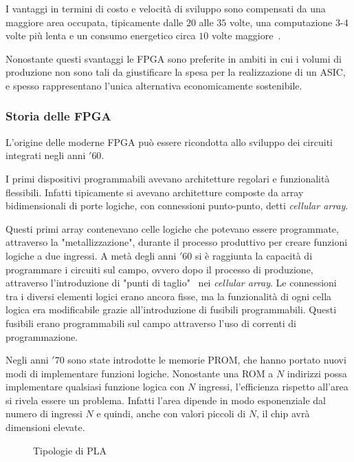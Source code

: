 I vantaggi in termini di costo e velocità di sviluppo sono compensati da una maggiore area occupata, tipicamente dalle $20$ alle $35$ volte, una computazione $3$-$4$ volte più lenta e un consumo energetico circa $10$ volte maggiore~\cite{4068926}.

Nonostante questi svantaggi le FPGA sono preferite in ambiti in cui i volumi di produzione non sono tali da giustificare la spesa per la realizzazione di un ASIC, e spesso rappresentano l'unica alternativa economicamente sostenibile.

\subsubsection{Storia delle FPGA}
L'origine delle moderne FPGA può essere ricondotta allo sviluppo dei circuiti integrati negli anni $'60$. 

I primi dispositivi programmabili avevano architetture regolari e funzionalità flessibili. Infatti tipicamente si avevano architetture composte da array bidimensionali di porte logiche, con connessioni punto-punto, detti \textit{cellular array}.

Questi primi array contenevano celle logiche che potevano essere programmate, attraverso la "metallizzazione", durante il processo produttivo per creare funzioni logiche a due ingressi. A metà degli anni $'60$ si è raggiunta la capacità di programmare i circuiti sul campo, ovvero dopo il processo di produzione, attraverso l'introduzione di "punti di taglio"~\cite{Minnick:1967:SMR:321386.321387} nei \textit{cellular array}. Le connessioni tra i diversi elementi logici erano ancora fisse, ma la funzionalità di ogni cella logica era modificabile grazie all'introduzione di fusibili programmabili. Questi fusibili erano programmabili sul campo attraverso l'uso di correnti di programmazione.

Negli anni $'70$ sono state introdotte le memorie PROM, che hanno portato nuovi modi di implementare funzioni logiche. Nonostante una ROM a $N$ indirizzi possa implementare qualsiasi funzione logica con $N$ ingressi, l'efficienza rispetto all'area si rivela essere un problema. Infatti l'area dipende in modo esponenziale dal numero di ingressi $N$ e quindi, anche con valori piccoli di $N$, il chip avrà dimensioni elevate.

\begin{figure}
\centering
{}
\hspace{5mm}
\caption{Tipologie di PLA}\label{plas}
\end{figure}

